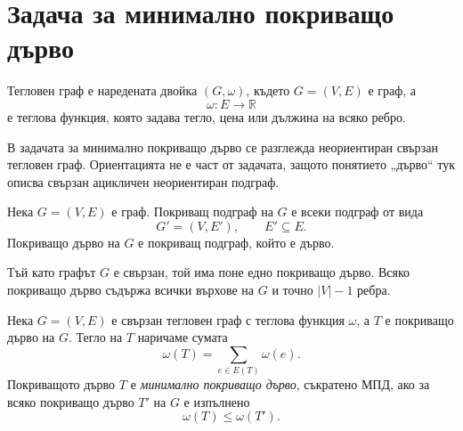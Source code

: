 \begin{konspekt}
\end{konspekt}

\section{Задача за минимално покриващо дърво}\label{s:7.1}

\begin{defn}
Тегловен граф е наредената двойка $(G,\omega)$, където $G=(V,E)$ е граф, а
\[
\omega:E\to\mathbb{R}
\]
е теглова функция, която задава тегло, цена или дължина на всяко ребро.
\end{defn}

В задачата за минимално покриващо дърво се разглежда неориентиран свързан тегловен граф. Ориентацията не е част от задачата, защото понятието „дърво“ тук описва свързан ацикличен неориентиран подграф.

\begin{defn}
Нека $G=(V,E)$ е граф. Покриващ подграф на $G$ е всеки подграф от вида
\[
G'=(V,E'), \qquad E'\subseteq E.
\]
Покриващо дърво на $G$ е покриващ подграф, който е дърво.
\end{defn}

Тъй като графът $G$ е свързан, той има поне едно покриващо дърво. Всяко покриващо дърво съдържа всички върхове на $G$ и точно $|V|-1$ ребра.

\begin{defn}
Нека $G=(V,E)$ е свързан тегловен граф с теглова функция $\omega$, а $T$ е покриващо дърво на $G$. Тегло на $T$ наричаме сумата
\[
\omega(T)=\sum_{e\in E(T)}\omega(e).
\]
Покриващото дърво $T$ е \emph{минимално покриващо дърво}, съкратено МПД, ако за всяко покриващо дърво $T'$ на $G$ е изпълнено
\[
\omega(T)\leq \omega(T').
\]
\end{defn}

